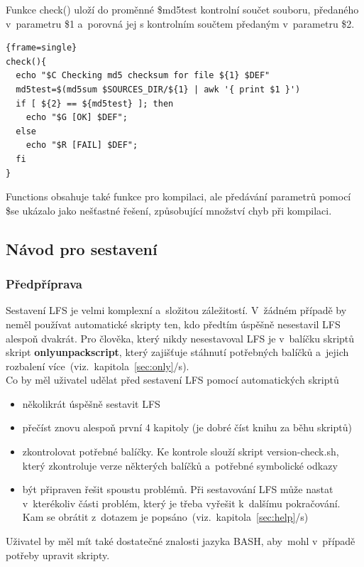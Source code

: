\documentclass[a4paper,12pt]{article}
\newcommand{\odkazNaKapitolu}[1]{(viz.~kapitola~\ref{#1}/s\pageref{#1})}
\renewcommand{\b}[1]{\textbf{#1}} %
\newenvironment{codeframe}{%
  \begin{Sbox} 
    \begin{minipage} 
      {\columnwidth-\leftmargin-\rightmargin-2\fboxsep-2\fboxrule-4pt} 
}{%

  \end{minipage} 
  \end{Sbox} 
  \begin{center} 
    \fcolorbox{black}{codeback}{\TheSbox} 
  \end{center} 
}
\begin{document}
Funkce check() uloží do proměnné \$md5test kontrolní součet souboru, předaného v~parametru \$1 a~porovná jej s kontrolním součtem předaným v~parametru \$2.
\label{func:md5}
    \begin{codeframe} 
\begin{Verbatim}{frame=single} 
check(){
  echo "$C Checking md5 checksum for file ${1} $DEF"
  md5test=$(md5sum $SOURCES_DIR/${1} | awk '{ print $1 }')
  if [ ${2} == ${md5test} ]; then
    echo "$G [OK] $DEF";
  else
    echo "$R [FAIL] $DEF";
  fi
}
\end{Verbatim} 
    \end{codeframe}

Functions obsahuje také funkce pro kompilaci, ale předávání parametrů pomocí \$\@ se ukázalo jako nešťastné řešení, způsobující množství chyb při kompilaci.

\subsection{Návod pro sestavení}
\subsubsection{Předpříprava}
Sestavení LFS je velmi komplexní a~složitou záležitostí. V~žádném případě by neměl používat automatické skripty ten, kdo předtím úspěšně nesestavil LFS alespoň dvakrát. Pro člověka, který nikdy nesestavoval LFS je v~balíčku skriptů skript \b{onlyunpackscript}, který zajišťuje stáhnutí potřebných balíčků a~jejich rozbalení více~\odkazNaKapitolu{sec:only}.\\

Co by měl uživatel udělat před sestavení LFS pomocí automatických skriptů
\begin{itemize}
 \item několikrát úspěšně sestavit LFS
 \item přečíst znovu alespoň první 4 kapitoly (je dobré číst knihu za běhu skriptů)
 \item zkontrolovat potřebné balíčky. Ke kontrole slouží skript version-check.sh, který zkontroluje verze některých balíčků a~potřebné symbolické odkazy
 \item být připraven řešit spoustu problémů. Při sestavování LFS může nastat v~kterékoliv části problém, který je třeba vyřešit k~dalšímu pokračování. Kam se obrátit z~dotazem je popsáno~\odkazNaKapitolu{sec:help}
\end{itemize}

Uživatel by měl mít také dostatečné znalosti jazyka BASH, aby~mohl v~případě potřeby upravit skripty.
\end{document}
